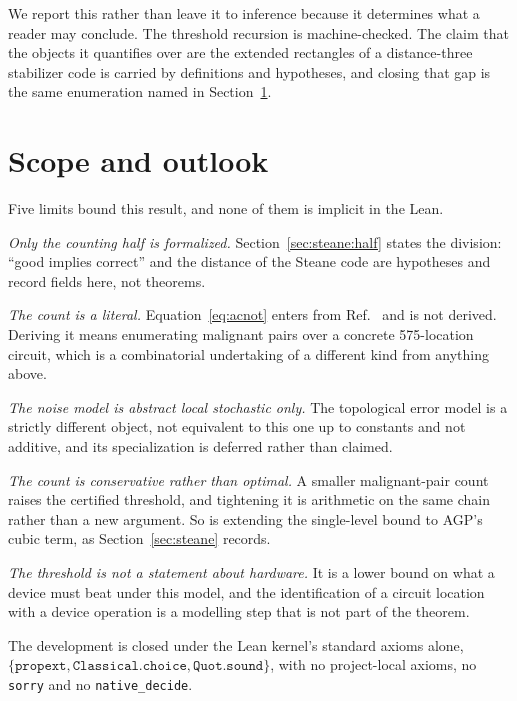 \documentclass[aps,prx,reprint,nofootinbib,superscriptaddress]{revtex4-2}
\begin{document}
We report this rather than leave it to inference because it determines what a
reader may conclude. The threshold recursion is machine-checked. The claim that
the objects it quantifies over are the extended rectangles of a distance-three
stabilizer code is carried by definitions and hypotheses, and closing that gap
is the same enumeration named in Section~\ref{sec:scope}.

\section{Scope and outlook}
\label{sec:scope}

Five limits bound this result, and none of them is implicit in the Lean.

\emph{Only the counting half is formalized.} Section~\ref{sec:steane:half} states
the division: ``good implies correct'' and the distance of the Steane code are
hypotheses and record fields here, not theorems.

\emph{The count is a literal.} Equation~\eqref{eq:acnot} enters from
Ref.~\cite{AGP2006} and is not derived. Deriving it means enumerating malignant
pairs over a concrete 575-location circuit, which is a combinatorial undertaking
of a different kind from anything above.

\emph{The noise model is abstract local stochastic only.} The topological error
model is a strictly different object, not equivalent to this one up to constants
and not additive, and its specialization is deferred rather than claimed.

\emph{The count is conservative rather than optimal.} A smaller malignant-pair
count raises the certified threshold, and tightening it is arithmetic on the
same chain rather than a new argument. So is extending the single-level bound to
AGP's cubic term, as Section~\ref{sec:steane} records.

\emph{The threshold is not a statement about hardware.} It is a lower bound on
what a device must beat under this model, and the identification of a circuit
location with a device operation is a modelling step that is not part of the
theorem.

The development is closed under the Lean kernel's standard axioms alone,
$\{\texttt{propext}, \texttt{Classical.choice}, \texttt{Quot.sound}\}$, with no
project-local axioms, no \texttt{sorry} and no \texttt{native\_decide}.
\end{document}

